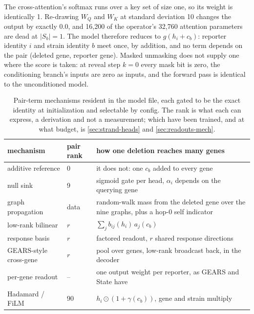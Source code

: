  The cross-attention's softmax runs
over a key set of size one, so its weight is identically 1. Re-drawing $W_Q$ and $W_K$ at
standard deviation 10 changes the output by exactly $0.0$, and 16{,}200 of the operator's
32{,}760 attention parameters are dead at $|S_b| = 1$. The model therefore reduces to
$g(h_i + c_b)$: reporter identity $i$ and strain identity $b$ meet once, by addition, and no
term depends on the pair (deleted gene, reporter gene). Masked unmasking does not supply
one where the score is taken: at reveal step $k = 0$ every mask bit is zero, the
conditioning branch's inputs are zero as inputs, and the forward pass is identical to the
unconditioned model.

\begin{table}[htbp]
\centering\small
\begin{tabular}{llp{62mm}}
\toprule
mechanism & pair rank & how one deletion reaches many genes \\
\midrule
additive reference & 0 & it does not: one $c_b$ added to every gene \\
null sink & 9 & sigmoid gate per head, $\alpha_i$ depends on the querying gene \\
graph propagation & data & random-walk mass from the deleted gene over the nine graphs, plus a hop-0 self indicator \\
low-rank bilinear & $r$ & $\sum_j b_{ij}(h_i)\, a_j(c_b)$ \\
response basis & $r$ & factored readout, $r$ shared response directions \\
GEARS-style cross-gene & $r$ & pool over genes, low-rank broadcast back, in the decoder \\
per-gene readout & -- & one output weight per reporter, as GEARS and State have \\
Hadamard / FiLM & 90 & $h_i \odot (1 + \gamma(c_b))$, gene and strain multiply \\
\bottomrule
\end{tabular}
\caption[]{Pair-term mechanisms resident in the model file, each gated to be the exact
identity at initialization and selectable by config. The rank is what each can express,
a derivation and not a measurement; which have been trained, and at what budget, is
\cref{sec:strand-heads} and \cref{sec:readouts-mech}.}
\label{tab:strand-pair-rank}
\end{table}


